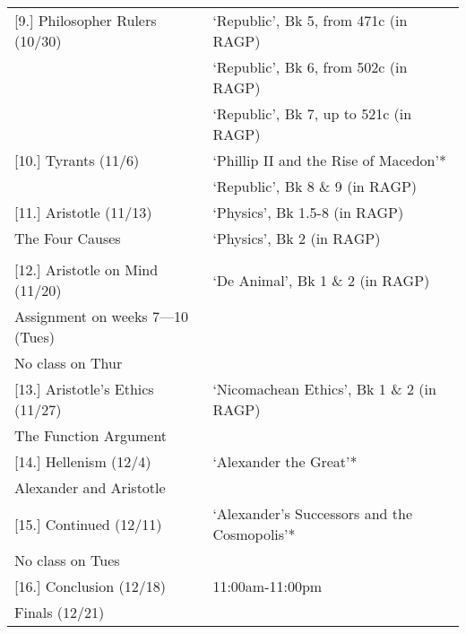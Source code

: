 \documentclass[article,oneside]{memoir}
\begin{document}
\begin{center}
\begin{longtable}{p{4.5cm}p{9cm}}
  							
[9.] Philosopher Rulers (10/30) 		& `Republic', Bk 5, from 471c (in RAGP) \\ 
						 	& `Republic', Bk 6, from 502c (in RAGP) \\ 
						 	& `Republic', Bk 7, up to 521c (in RAGP) \\ [1\baselineskip] \midrule


[10.] Tyrants (11/6)				& `Phillip II and the Rise of Macedon'* \\
			       				& `Republic', Bk 8 \& 9 (in RAGP) \\ [1\baselineskip] \midrule

	

[11.] Aristotle (11/13)		 		& `Physics',  Bk 1.5-8 (in RAGP)  \\ 
The Four Causes				& `Physics', Bk 2 (in RAGP) \\  \\ [1\baselineskip] \midrule
						
					
[12.] Aristotle on Mind (11/20)	 	& `De Animal', Bk 1 \& 2 (in RAGP) \\
Assignment on weeks 7---10 (Tues)  & 	 \\ 		
No class on Thur				& 	 \\ 	[\baselineskip] \midrule		


			
[13.] Aristotle's Ethics (11/27)		 & `Nicomachean Ethics', Bk 1 \& 2 (in RAGP) \\
The Function Argument			& 	 \\ [\baselineskip] \midrule

[14.] Hellenism (12/4)			&  `Alexander the Great'* \\  
Alexander and Aristotle			&   \\  [1\baselineskip] \midrule


[15.] Continued (12/11) 			& `Alexander's Successors and the Cosmopolis'* \\ 
No class on Tues				& \\ [1\baselineskip] \midrule
	
[16.] Conclusion (12/18) 			& 11:00am-11:00pm \\ 
Finals (12/21)					& \\ [1\baselineskip] \midrule

	

\end{longtable}
\end{center}
\end{document}
